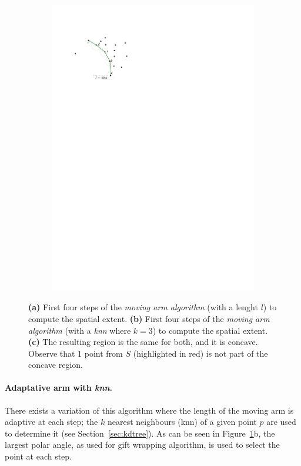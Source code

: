 \begin{figure}
\begin{subfigure}[b]{0.3\linewidth}
    \includegraphics[page=3,width=\textwidth]{figs/movingarm.pdf}
    \caption{}
  \end{subfigure}
  \caption{\textbf{(a)} First four steps of the \emph{moving arm algorithm} (with a lenght $l$) to compute the spatial extent. \textbf{(b)} First four steps of the \emph{moving arm algorithm} (with a \emph{knn} where $k=3$) to compute the spatial extent. \textbf{(c)} The resulting region is the same for both, and it is concave. Observe that 1 point from $S$ (highlighted in red) is not part of the concave region.}
\label{fig:movingarm}
\end{figure}

%

\paragraph{Adaptative arm with \emph{knn}.} 
There exists a variation of this algorithm where the length of the moving arm is adaptive at each step; the $k$ nearest neighbours (knn) of a given point $p$ are used to determine it (see Section~\ref{sec:kdtree}).
As can be seen in Figure~\ref{fig:movingarm}b, the largest polar angle, as used for gift wrapping algorithm, is used to select the point at each step.

